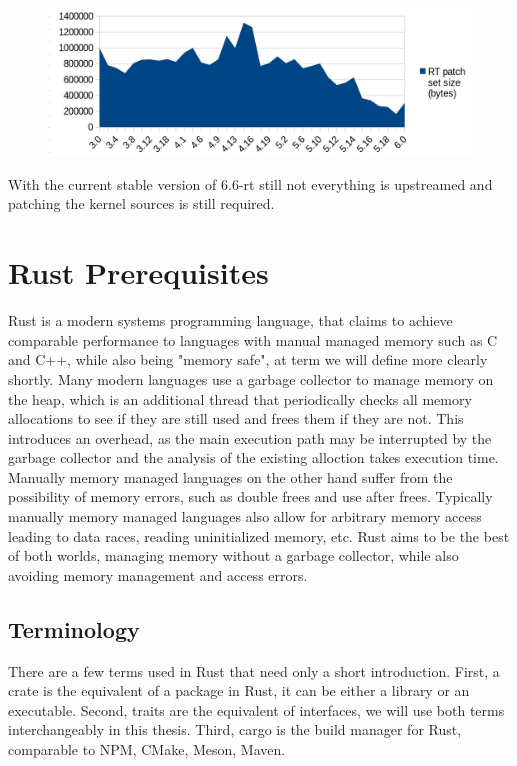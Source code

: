 \begin{figure}
    \includegraphics[width=\textwidth]{assets/preempt.jpg}
    \caption{}
    \label{}
\end{figure}

With the current stable version of 6.6-rt still not everything is upstreamed and patching the kernel sources is still required.

\section{Rust Prerequisites}
\label{sec:background:rust}

Rust is a modern systems programming language,
that claims to achieve comparable performance to languages with manual managed memory such as C and C++,
while also being "memory safe", at term we will define more clearly shortly.
Many modern languages use a garbage collector to manage memory on the heap,
which is an additional thread that periodically checks all memory allocations to see if they are still used and frees them if they are not.
This introduces an overhead, as the main execution path may be interrupted by the garbage collector and the analysis of the existing alloction takes execution time.
Manually memory managed languages on the other hand suffer from the possibility of memory errors, such as double frees and use after frees.
Typically manually memory managed languages also allow for arbitrary memory access leading to data races, reading uninitialized memory, etc.
Rust aims to be the best of both worlds, managing memory without a garbage collector, while also avoiding memory management and access errors.

\subsection{Terminology}
\label{sec:background:terminology}

There are a few terms used in Rust that need only a short introduction.
First, a crate is the equivalent of a package in Rust, it can be either a library or an executable.
Second, traits are the equivalent of interfaces, we will use both terms interchangeably in this thesis.
Third, cargo is the build manager for Rust, comparable to NPM, CMake, Meson, Maven.

